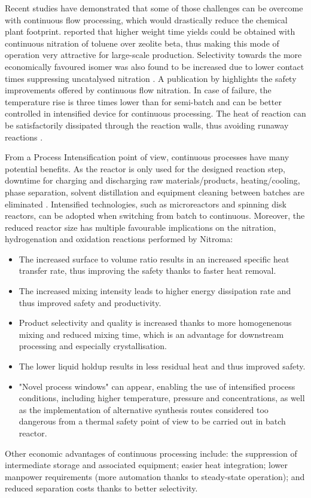 Recent studies have demonstrated that some of those challenges can be overcome with continuous flow processing, which would drastically reduce the chemical plant footprint. \textcite{kuba_batch_2007} reported that higher weight time yields could be obtained with continuous nitration of toluene over zeolite beta, thus making this mode of operation very attractive for large-scale production. Selectivity towards the more economically favoured \para isomer was also found to be increased due to lower contact times suppressing uncatalysed nitration \cite{kuba_batch_2007}. A publication by \textcite{di_miceli_raimondi_safety_2015} highlights the safety improvements offered by continuous flow nitration. In case of failure, the temperature rise is three times lower than for semi-batch and can be better controlled in intensified device for continuous processing. The heat of reaction can be satisfactorily dissipated through the reaction walls, thus avoiding runaway reactions \cite{di_miceli_raimondi_safety_2015}. 

From a Process Intensification point of view, continuous processes have many potential benefits. As the  reactor is only used for the designed reaction step, downtime for charging and discharging raw materials/products, heating/cooling, phase separation, solvent distillation and equipment cleaning between batches are eliminated \cite{randall_process_2020}. Intensified technologies, such as microreactors and spinning disk reactors, can be adopted when switching from batch to continuous. Moreover, the reduced reactor size has multiple favourable implications on the nitration, hydrogenation and oxidation reactions performed by Nitroma:
\begin{itemize}
    \item The increased surface to volume ratio results in an increased specific heat transfer rate, thus improving the safety thanks to faster heat removal.
    \item The increased mixing intensity leads to higher energy dissipation rate and thus improved safety and productivity.
    \item Product selectivity and quality is increased thanks to more homogenenous mixing and reduced mixing time, which is an advantage for downstream processing and especially crystallisation.
    \item The lower liquid holdup results in less residual heat and thus improved safety.
    \item "Novel process windows" can appear, enabling the use of intensified process conditions, including higher temperature, pressure and concentrations, as well as the implementation of alternative synthesis routes considered too dangerous from  a thermal safety point of view to be carried out in batch reactor.
\end{itemize}
Other economic advantages of continuous processing include: the suppression of intermediate storage and associated equipment; easier heat integration; lower manpower requirements (more automation thanks to steady-state operation); and reduced separation costs thanks to better selectivity.

